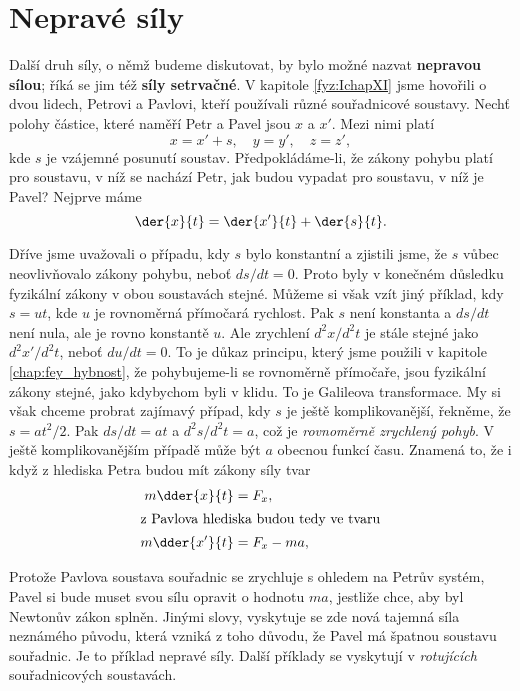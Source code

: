   \section{Nepravé síly}\label{fyz:IchapXIIsecVI}
    Další druh síly, o němž budeme diskutovat, by bylo možné nazvat \textbf{nepravou sílou}; říká 
    se jim též \textbf{síly setrvačné}. V kapitole \ref{fyz:IchapXI} jsme hovořili o dvou 
    lidech, Petrovi a Pavlovi, kteří používali různé souřadnicové soustavy. Nechť polohy částice, 
    které naměří Petr a Pavel jsou \(x\) a \(x'\). Mezi nimi platí
    \begin{equation}\label{fyz:eq0178}
      x = x' + s, \quad y=y', \quad z=z',
    \end{equation}
    kde \(s\) je vzájemné posunutí soustav. Předpokládáme-li, že zákony pohybu platí pro soustavu, 
    v níž se nachází Petr, jak budou vypadat pro soustavu, v níž je Pavel? Nejprve máme
    \begin{equation}\label{fyz:eq0179}
      \der{x}{t} = \der{x'}{t} + \der{s}{t}.
    \end{equation}
    
    Dříve jsme uvažovali o případu, kdy \(s\) bylo konstantní a zjistili jsme, že \(s\) vůbec 
    neovlivňovalo zákony pohybu, neboť \(ds/dt = 0\). Proto byly v konečném důsledku fyzikální 
    zákony v obou soustavách stejné. Můžeme si však vzít jiný příklad, kdy \(s=ut\), kde \(u\) je 
    rovnoměrná přímočará rychlost. Pak \(s\) není konstanta a \(ds/dt\) není nula, ale je rovno 
    konstantě \(u\). Ale zrychlení \(d^2x/d^2t\) je stále stejné jako \(d^2x'/d^2t\), neboť 
    \(du/dt=0\). To je důkaz principu, který jsme použili v kapitole \ref{chap:fey_hybnost}, že 
    pohybujeme-li se rovnoměrně přímočaře, jsou fyzikální zákony stejné, jako kdybychom byli v 
    klidu. To je Galileova transformace. My si však chceme probrat zajímavý případ, kdy \(s\) je 
    ještě komplikovanější, řekněme, že \(s=at^2/2\). Pak \(ds/dt=at\) a \(d^2s/d^2t = a\), což je 
    \emph{rovnoměrně zrychlený pohyb}. V ještě komplikovanějším případě může být \(a\) obecnou 
    funkcí času. Znamená to, že i když z hlediska Petra budou mít zákony síly tvar
    \begin{align}
      m\dder{x}{t}  &= F_x,        \label{fyz:eq0180} \\
      \shortintertext{z Pavlova hlediska budou tedy ve tvaru} 
      m\dder{x'}{t} &= F_x - ma,   \label{fyz:eq0181}
    \end{align}
    
    Protože Pavlova soustava souřadnic se zrychluje s ohledem na Petrův systém, Pavel si bude muset 
    svou sílu opravit o hodnotu \(ma\), jestliže chce, aby byl Newtonův zákon splněn. Jinými slovy, 
    vyskytuje se zde nová tajemná síla neznámého původu, která vzniká z toho důvodu, že Pavel má 
    špatnou soustavu souřadnic. Je to příklad nepravé síly. Další příklady se vyskytují v 
    \emph{rotujících} souřadnicových soustavách.
    
